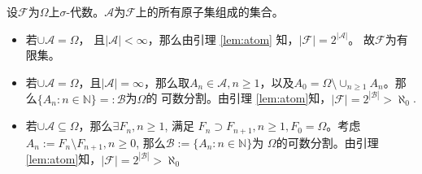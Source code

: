 \documentclass{ctexart}
\begin{document}
\begin{solution}
设\(\mathcal{F} \)为\(\Omega \)上\(\sigma \)-代数。\( \mathcal{A}\)为\(\mathcal{F} \)上的所有原子集组成的集合。
\begin{itemize}
  \item 若\(\cup \mathcal{A} = \Omega\)， 且\(|\mathcal{A}| < \infty \)，那么由引理 \ref{lem:atom} 知，\(|\mathcal{F}|=2^{|\mathcal{A}|} \)。 故\(\mathcal{F} \)为有限集。
  \item 若\(\cup \mathcal{A} =\Omega \)，且\(|\mathcal{A}| = \infty \)，那么取\(A_n \in \mathcal{A}, n \geq 1 \)，以及\(A_0=\Omega \setminus \cup_{n \geq 1}A_n \)。那么\(\{A_n:n \in \mathbb{N}\} =: \mathcal{B} \)为\(\Omega \)的 
    可数分割。由引理 \ref{lem:atom}知，\(|\mathcal{F}|=2^{|\mathcal{B}|}> \aleph_0 \).
  \item 若\(\cup \mathcal{A} \subseteq \Omega \)，那么\(\exists F_n, n \geq 1 \), 满足 \(F_n\supset F_{n + 1}, n \geq 1, F_0=\Omega\)。考虑\(A_n:=F_{n } \setminus F_{n + 1}, n \geq 0\), 那么\(\mathcal{B}:=\{A_n: n \in \mathbb{N}\} \)为 
    \(\Omega \)的可数分割。由引理 \ref{lem:atom}知，\(|\mathcal{F}|=2^{|\mathcal{B}|} > \aleph_0 \)
\end{itemize}

\end{solution}
\end{document}
